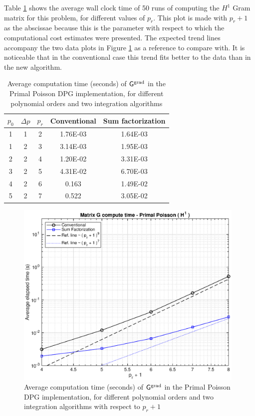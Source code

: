 Table \ref{tab:results_poisson1} shows the average wall clock time of 50 runs of computing the $H^1$ Gram matrix for this problem, for different values of $p_r$. This plot is made with $p_r+1$ as the abscissae because this is the parameter with respect to which the computational cost estimates were presented. The expected trend lines accompany the two data plots in Figure \ref{fig:results_poisson1} as a reference to compare with. It is noticeable that in the conventional case this trend fits better to the data than in the new algorithm.
%
\begin{table}[ht]
    \centering
    \begin{tabular}{|c|c|c|c|c|}
    \hline
    $p_0$ & $\Delta p$ & $p_r$ & \textbf{Conventional} & \textbf{Sum factorization} \\
    \hline
    1	&	1	&	2	&	1.76E-03	&	1.64E-03	\\
    1	&	2	&	3	&	3.14E-03	&	1.95E-03	\\
    2	&	2	&	4	&	1.20E-02	&	3.31E-03	\\
    3	&	2	&	5	&	4.31E-02	&	6.70E-03	\\
    4	&	2	&	6	&	0.163	&	1.49E-02	\\
    5	&	2	&	7	&	0.522	&	3.05E-02	\\
    \hline
    \end{tabular}
    \caption{Average computation time (seconds) of $\mathsf{G}^{\operatorname{grad}}$ in the Primal Poisson DPG implementation, for different polynomial orders and two integration algorithms}
    \label{tab:results_poisson1}
\end{table}
%
\begin{figure}[ht]
    \centering
    \includegraphics[width=11cm]{poisson_G.eps}
    \caption{Average computation time (seconds) of $\mathsf{G}^{\operatorname{grad}}$ in the Primal Poisson DPG implementation, for different polynomial orders and two integration algorithms with respect to $p_r+1$}
    \label{fig:results_poisson1}
\end{figure}

